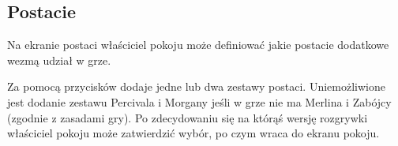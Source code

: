 \documentclass[12pt]{article}
\begin{document}
\subsection{Postacie}
Na ekranie postaci właściciel pokoju może definiować jakie postacie dodatkowe wezmą udział w grze.
\begin{figure}[!htb]
    \centering
    \centering
\end{figure}

Za pomocą przycisków dodaje jedne lub dwa zestawy postaci. Uniemożliwione jest dodanie zestawu Percivala i Morgany jeśli w grze nie ma Merlina i Zabójcy (zgodnie z zasadami gry). Po zdecydowaniu się na którąś wersję rozgrywki właściciel pokoju może zatwierdzić wybór, po czym wraca do ekranu pokoju.
\end{document}
